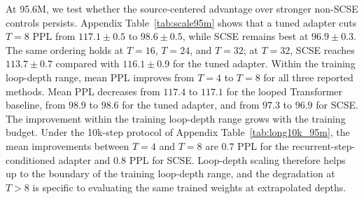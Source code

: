\documentclass[letterpaper]{article} %
\newcommand{\SCSE}{\textsc{SCSE}}
\theoremstyle{remark}
\begin{document}
At 95.6M, we test whether the source-centered advantage over stronger non-\SCSE{} controls persists.  Appendix Table~\ref{tab:scale95m} shows that a tuned adapter cuts $T=8$ PPL from $117.1\pm0.5$ to $98.6\pm0.5$, while \SCSE{} remains best at $96.9\pm0.3$.  The same ordering holds at $T=16$, $T=24$, and $T=32$; at $T=32$, \SCSE{} reaches $113.7\pm0.7$ compared with $116.1\pm0.9$ for the tuned adapter.  Within the training loop-depth range, mean PPL improves from $T=4$ to $T=8$ for all three reported methods.  Mean PPL decreases from $117.4$ to $117.1$ for the looped Transformer baseline, from $98.9$ to $98.6$ for the tuned adapter, and from $97.3$ to $96.9$ for \SCSE{}.  The improvement within the training loop-depth range grows with the training budget.  Under the 10k-step protocol of Appendix Table~\ref{tab:long10k_95m}, the mean improvements between $T=4$ and $T=8$ are $0.7$ PPL for the recurrent-step-conditioned adapter and $0.8$ PPL for \SCSE{}.  Loop-depth scaling therefore helps up to the boundary of the training loop-depth range, and the degradation at $T>8$ is specific to evaluating the same trained weights at extrapolated depths.
\end{document}
